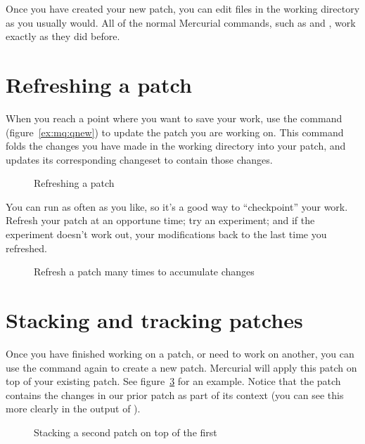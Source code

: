 Once you have created your new patch, you can edit files in the
working directory as you usually would.  All of the normal Mercurial
commands, such as  and , work exactly as
they did before.

\section{Refreshing a patch}

When you reach a point where you want to save your work, use the
 command (figure~\ref{ex:mq:qnew}) to update the patch
you are working on.  This command folds the changes you have made in
the working directory into your patch, and updates its corresponding
changeset to contain those changes.

\begin{figure}[ht]
  \caption{Refreshing a patch}
  \label{ex:mq:qrefresh}
\end{figure}

You can run  as often as you like, so it's a good way
to ``checkpoint'' your work.  Refresh your patch at an opportune
time; try an experiment; and if the experiment doesn't work out,
 your modifications back to the last time you refreshed.

\begin{figure}[ht]
  \caption{Refresh a patch many times to accumulate changes}
  \label{ex:mq:qrefresh2}
\end{figure}

\section{Stacking and tracking patches}

Once you have finished working on a patch, or need to work on another,
you can use the  command again to create a new patch.
Mercurial will apply this patch on top of your existing patch.  See
figure~\ref{ex:mq:qnew2} for an example.  Notice that the patch
contains the changes in our prior patch as part of its context (you
can see this more clearly in the output of ).

\begin{figure}[ht]
  \caption{Stacking a second patch on top of the first}
  \label{ex:mq:qnew2}
\end{figure}

